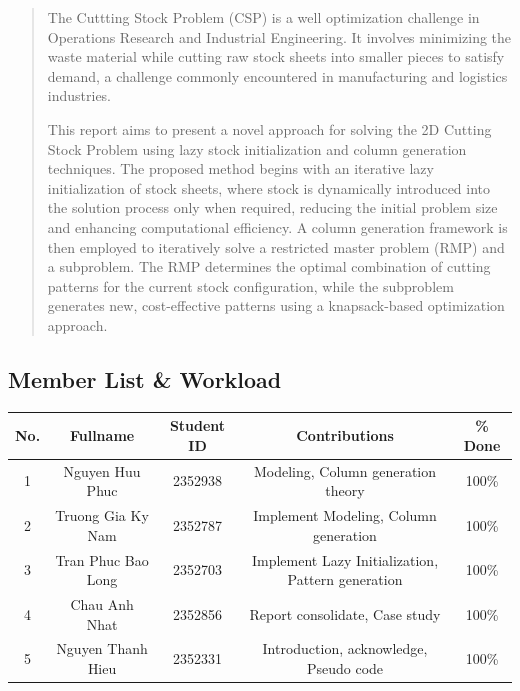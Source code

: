\documentclass[a4paper]{article}
\begin{document}
\thispagestyle{empty}
\setcounter{page}{-2}
\newpage
\begin{abstract}
        
    \noindent The Cuttting Stock Problem (CSP) is a well optimization challenge in Operations Research and Industrial Engineering. It involves minimizing the waste material while cutting raw stock sheets into smaller pieces to satisfy demand, a challenge commonly encountered in manufacturing and logistics industries.
    
    \vspace{0.4cm}
    
    \noindent  This report aims to present a novel approach for solving the 2D Cutting Stock Problem using lazy stock initialization and column generation techniques. The proposed method begins with an iterative lazy initialization of stock sheets, where stock is dynamically introduced into the solution process only when required, reducing the initial problem size and enhancing computational efficiency. A column generation framework is then employed to iteratively solve a restricted master problem (RMP) and a subproblem. The RMP determines the optimal combination of cutting patterns for the current stock configuration, while the subproblem generates new, cost-effective patterns using a knapsack-based optimization approach.
\end{abstract}
\setcounter{page}{-1}
\newpage
\subsection*{Member List \& Workload}
\begin{center} %
\begin{table}[H]
\centering
\renewcommand{\arraystretch}{1.5}
\begin{tabular}{|c|c|c|c|c|}
\hline
\textbf{No.} & \textbf{Fullname} & \textbf{Student ID} & \textbf{Contributions} & \textbf{\% Done} \\ \hline
1 & Nguyen Huu Phuc & 2352938 & Modeling, Column generation theory & 100\% \\ \hline
2 & Truong Gia Ky Nam & 2352787 & Implement Modeling, Column generation & 100\% \\ \hline
3 & Tran Phuc Bao Long & 2352703 & Implement Lazy Initialization, Pattern generation & 100\% \\ \hline
4 & Chau Anh Nhat & 2352856 & Report consolidate, Case study & 100\% \\ \hline
5 & Nguyen Thanh Hieu & 2352331 & Introduction, acknowledge, Pseudo code & 100\% \\ \hline
\end{tabular}
\end{table}
\end{center} %
\newpage
\end{document}
